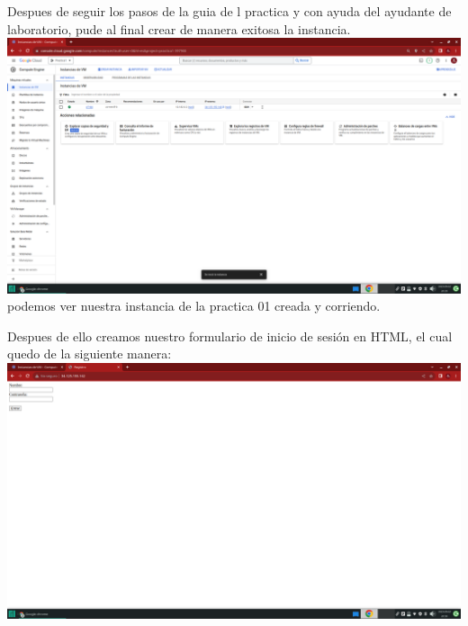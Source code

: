 \documentclass[12pt]{article}
\begin{document}
Despues de seguir los pasos de la guia de l practica y con ayuda del ayudante de laboratorio, pude al final crear de manera exitosa la instancia.\\
\textbf{\includegraphics[scale = 0.30]{images/instancia creada y corriendo.png}}\\
podemos ver nuestra instancia de la practica 01 creada y corriendo.
\vspace{2em}

Despues de ello creamos nuestro formulario de inicio de sesión en HTML, el cual quedo de la siguiente manera:\\
\textbf{\includegraphics[scale = 0.25]{images/Formulario.png}}\\
\end{document}
